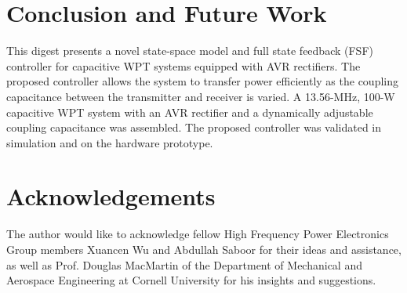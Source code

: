 \documentclass[conference, twocolumn, letterpaper]{IEEEtran}
\begin{document}
\section{Conclusion and Future Work}
\label{sec:conclusion}

This digest presents a novel state-space model and full state feedback (FSF) controller for capacitive WPT systems equipped with AVR rectifiers. The proposed controller allows the system to transfer power efficiently as the coupling capacitance between the transmitter and receiver is varied. A 13.56-MHz, 100-W capacitive WPT system with an AVR rectifier and a dynamically adjustable coupling capacitance was assembled. The proposed controller was validated in simulation and on the hardware prototype.

\section{Acknowledgements}
\label{sec:ack}

The author would like to acknowledge fellow High Frequency Power Electronics Group members Xuancen Wu and Abdullah Saboor for their ideas and assistance, as well as Prof. Douglas MacMartin of the Department of Mechanical and Aerospace Engineering at Cornell University for his insights and suggestions.

\footnotesize
\begin{spacing}{1.0}


\end{spacing}
\end{document}
